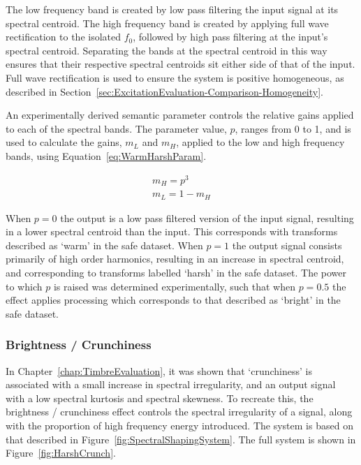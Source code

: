 			The low frequency band is created by low pass filtering the input signal at its spectral centroid.
			The high frequency band is created by applying full wave rectification to the isolated $f_{0}$,
			followed by high pass filtering at the input's spectral centroid.  Separating the bands at the
			spectral centroid in this way ensures that their respective spectral centroids sit either side of
			that of the input. Full wave rectification is used to ensure the system is positive homogeneous, as
			described in Section~\ref{sec:ExcitationEvaluation-Comparison-Homogeneity}.

			An experimentally derived semantic parameter controls the relative gains applied to each of the
			spectral bands. The parameter value, $p$, ranges from 0 to 1, and is used to calculate the gains,
			$m_{L}$ and $m_{H}$, applied to the low and high frequency bands, using
			Equation~\ref{eq:WarmHarshParam}.

			\begin{gather}
				m_{H} = p^{3} \nonumber \\
				m_{L} = 1 - m_{H}
				\label{eq:WarmHarshParam}
			\end{gather}

			When $p = 0$  the output is a low pass filtered version of the input signal, resulting in a lower
			spectral centroid than the input. This corresponds with transforms described as `warm' in the
			\acrshort{safe} dataset. When $p = 1$ the output signal consists primarily of high order harmonics,
			resulting in an increase in spectral centroid, and corresponding to transforms labelled `harsh' in
			the \acrshort{safe} dataset.  The power to which $p$ is raised was determined experimentally, such
			that when $p = 0.5$ the effect applies processing which corresponds to that described as `bright'
			in the \acrshort{safe} dataset. 

		\subsubsection*{Brightness / Crunchiness}
			In Chapter~\ref{chap:TimbreEvaluation}, it was shown that `crunchiness' is associated with a small
			increase in spectral irregularity, and an output signal with a low spectral kurtosis and spectral
			skewness. To recreate this, the brightness / crunchiness effect controls the spectral irregularity
			of a signal, along with the proportion of high frequency energy introduced. The system is based on
			that described in Figure~\ref{fig:SpectralShapingSystem}. The full system is shown in
			Figure~\ref{fig:HarshCrunch}.

